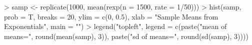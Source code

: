 \begin{Schunk}
\begin{Sinput}
> samp <- replicate(1000, mean(rexp(n = 1500, rate = 1/50)))
> hist(samp, prob = T, breaks = 20, ylim = c(0, 
      0.5), xlab = "Sample Means from Exponentials", 
      main = "")
> legend("topleft", legend = c(paste("mean of means=", 
      round(mean(samp), 3)), paste("sd of means=", 
      round(sd(samp), 3))))
\end{Sinput}
\end{Schunk}
